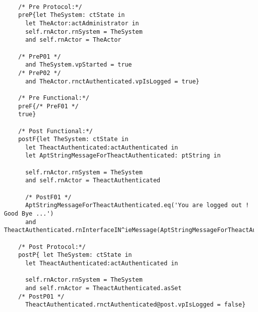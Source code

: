 	\scriptsize
	\vspace{0.5cm}
	\begin{lstlisting}[style=MessirStyle,firstnumber=auto,captionpos=b,caption={\msrmessir (MCL-oriented) specification of the operation \emph{oeLogout}.},label=OM-actAuthenticated-oeLogout-MCL-LST]

	/* Pre Protocol:*/ 
	preP{let TheSystem: ctState in
	  let TheActor:actAdministrator in
	  self.rnActor.rnSystem = TheSystem
	  and self.rnActor = TheActor
	  
	/* PreP01 */
	  and TheSystem.vpStarted = true
	/* PreP02 */
	  and TheActor.rnctAuthenticated.vpIsLogged = true}
	
	/* Pre Functional:*/
	preF{/* PreF01 */
	true}
	
	/* Post Functional:*/ 
	postF{let TheSystem: ctState in
	  let TheactAuthenticated:actAuthenticated in
	  let AptStringMessageForTheactAuthenticated: ptString in
	  
	  self.rnActor.rnSystem = TheSystem
	  and self.rnActor = TheactAuthenticated
	  
	  /* PostF01 */
	  AptStringMessageForTheactAuthenticated.eq('You are logged out ! Good Bye ...')
	  and TheactAuthenticated.rnInterfaceIN^ieMessage(AptStringMessageForTheactAuthenticated)}
	
	/* Post Protocol:*/ 
	postP{ let TheSystem: ctState in
	  let TheactAuthenticated:actAuthenticated in
	
	  self.rnActor.rnSystem = TheSystem
	  and self.rnActor = TheactAuthenticated.asSet
	/* PostP01 */
	  TheactAuthenticated.rnctAuthenticated@post.vpIsLogged = false}
	
	\end{lstlisting}
	\normalsize 
	
	
	
	





